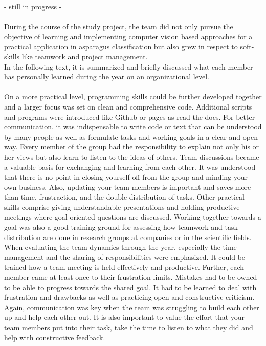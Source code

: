 - still in progress - \\
\\
During the course of the study project, the team did not only pursue the objective of learning and implementing computer vision based approaches for a practical application in asparagus classification but also grew in respect to soft-skills like teamwork and project management. \\
In the following text, it is summarized and briefly discussed what each member has personally learned during the year on an organizational level. \\
\\
On a more practical level, programming skills could be further developed together and a larger focus was set on clean and comprehensive code. Additional scripts and programs were introduced like Github or pages as read the docs. For better communication, it was indispensable to write code or text that can be understood by many people as well as formulate tasks and working goals in a clear and open way. Every member of the group had the responsibility to explain not only his or her views but also learn to listen to the ideas of others. Team discussions became a valuable basis for exchanging and learning from each other. It was understood that there is no point in closing yourself off from the group and minding your own business. Also, updating your team members is important and saves more than time, frustraction, and the double-distribution of tasks. Other practical skills comprise giving understandable presentations and holding productive meetings where goal-oriented questions are discussed. Working together towards a goal was also a good training ground for assessing how teamwork and task distribution are done in research groups at companies or in the scientific fields. \\
When evaluating the team dynamics through the year, especially the time management and the sharing of responsibilities were emphasized. It could be trained how a team meeting is held effectively and productive. Further, each member came at least once to their frustration limits. Mistakes had to be owned to be able to progress towards the shared goal. It had to be learned to deal with frustration and drawbacks as well as practicing open and constructive criticism. Again, communication was key when the team was struggling to build each other up and help each other out. It is also important to value the effort that your team members put into their task, take the time to listen to what they did and help with constructive feedback. \\
